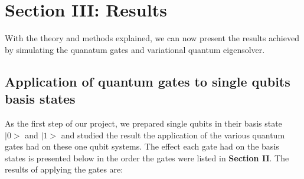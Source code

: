 \documentclass[onecolumn,10pt,cleanfoot]{asme2ej}
\begin{document}
\section{Section III: Results}

With the theory and methods explained, we can now present the results achieved by simulating the quanatum gates and variational quantum eigensolver.

\subsection{Application of quantum gates to single qubits basis states}

As the first step of our project, we prepared single qubits in their basis state $|0>$ and $|1>$ and studied the result the application of the various quantum gates had on these one qubit systems. The effect each gate had on the basis states is presented below in the order the gates were listed in \textbf{Section II}. The results of applying the gates are: 
\end{document}
